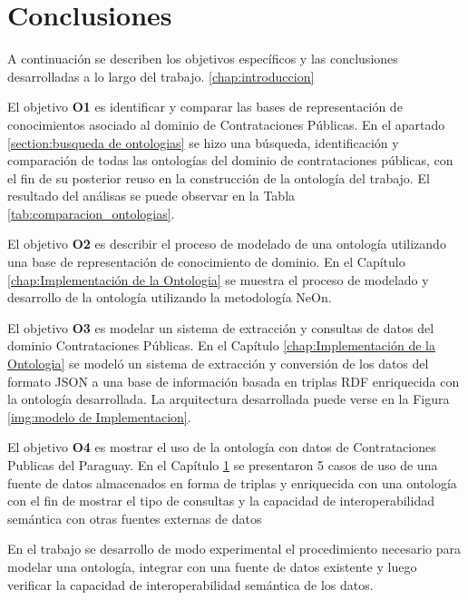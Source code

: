 \section{Conclusiones}
\label{chap:analisis}
A continuación se describen los objetivos específicos y las conclusiones desarrolladas a lo largo del trabajo. \ref{chap:introduccion} 

El objetivo \textbf{O1} es identificar y comparar las bases de representación de conocimientos asociado al dominio de Contrataciones Públicas. En el apartado \ref{section:busqueda de ontologias} se hizo una búsqueda, identificación y comparación de todas las ontologías del dominio de contrataciones públicas, con el fin de su posterior reuso en la construcción de la ontología del trabajo. El resultado del análisas se puede observar en la Tabla \ref{tab:comparacion_ontologias}.

El objetivo \textbf{O2} es describir el proceso de modelado de una ontología utilizando una base de representación de conocimiento de dominio. En el Capítulo \ref{chap:Implementación de la Ontologia} se muestra el proceso de modelado y desarrollo de la ontología utilizando la metodología NeOn.

El objetivo \textbf{O3} es modelar un sistema de extracción y consultas de datos del dominio Contrataciones Públicas. En el Capítulo \ref{chap:Implementación de la Ontologia} se modeló un sistema de extracción y conversión de los datos del formato JSON a una base de información basada en triplas RDF enriquecida con la ontología desarrollada. La arquitectura desarrollada puede verse en la Figura \ref{img:modelo de Implementacion}.

El objetivo \textbf{O4} es mostrar el uso de la ontología con datos de Contrataciones Publicas del Paraguay. En el Capítulo \ref{chap:analisis} se presentaron 5 casos de uso de una fuente de datos almacenados en forma de triplas y enriquecida con una ontología con el fin de mostrar el tipo de consultas y la capacidad de interoperabilidad semántica con otras fuentes externas de datos

En el trabajo se desarrollo de modo experimental el procedimiento necesario para modelar una ontología, integrar con una fuente de datos existente y luego verificar la capacidad de interoperabilidad semántica de los datos. 